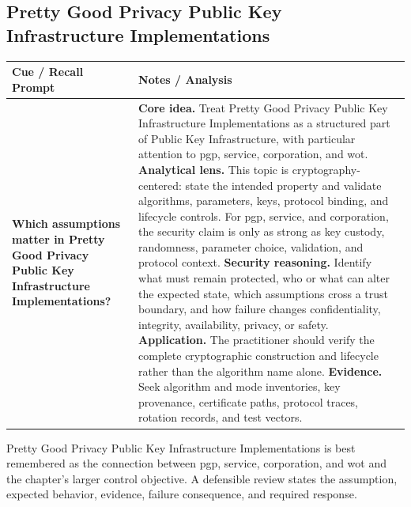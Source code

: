 \documentclass[11pt]{article}
\newcommand{\CornellHeader}{%
\rowcolor{Navy}\color{white}\bfseries Cue / Recall Prompt & \color{white}\bfseries Notes / Analysis\\\hline}
\newcommand{\CornellRow}[2]{%
\cellcolor{CueGray}\RaggedRight\textbf{#1} & \RaggedRight #2\\\hline}
\begin{document}
\subsection*{Pretty Good Privacy Public Key Infrastructure Implementations}
\begin{longtable}{>{\RaggedRight\arraybackslash}p{}|>{\RaggedRight\arraybackslash}p{}}
\CornellHeader
\CornellRow{Which assumptions matter in Pretty Good Privacy Public Key Infrastructure Implementations?}{\textbf{Core idea.} Treat Pretty Good Privacy Public Key Infrastructure Implementations as a structured part of Public Key Infrastructure, with particular attention to pgp, service, corporation, and wot. \textbf{Analytical lens.} This topic is cryptography-centered: state the intended property and validate algorithms, parameters, keys, protocol binding, and lifecycle controls. For pgp, service, and corporation, the security claim is only as strong as key custody, randomness, parameter choice, validation, and protocol context. \textbf{Security reasoning.} Identify what must remain protected, who or what can alter the expected state, which assumptions cross a trust boundary, and how failure changes confidentiality, integrity, availability, privacy, or safety. \textbf{Application.} The practitioner should verify the complete cryptographic construction and lifecycle rather than the algorithm name alone. \textbf{Evidence.} Seek algorithm and mode inventories, key provenance, certificate paths, protocol traces, rotation records, and test vectors.}
\end{longtable}
\begin{topicsummary}
Pretty Good Privacy Public Key Infrastructure Implementations is best remembered as the connection between pgp, service, corporation, and wot and the chapter's larger control objective. A defensible review states the assumption, expected behavior, evidence, failure consequence, and required response.
\end{topicsummary}
\end{document}
